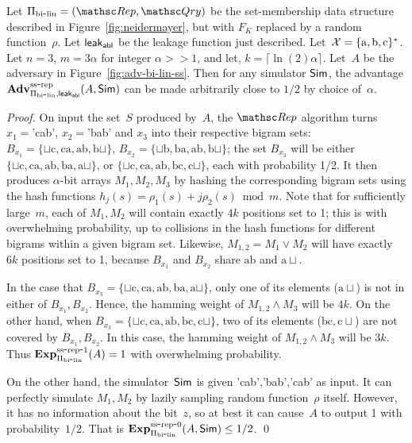 \begin{theorem}\label{thm:bi-lin-ss}
Let $\setprim_{\bilin}= (\Rep, \Qry)$ be the set-membership data
structure described in Figure~\ref{fig:neidermayer}, but with
$F_{K}$ replaced by a random function~$\rho$. Let
${\sf leak}_{\mathsf{abl}}$ be the leakage function just described.
Let~${\cal X}=\{\mathrm{a,b,c}\}^*$. Let $n=3$,  $m=3\alpha $ for
integer $\alpha >> 1$, and let, $k = \lceil \ln(2) \alpha
\rceil$.  Let~$A$ be the adversary in
Figure~\ref{fig:adv-bi-lin-ss}.  Then for any simulator ${\sf Sim}$, the
advantage
$\mathrm{\mathbf{Adv}}^{\mathrm{ss\mbox{-}rep}}_{\Pi_{\mathrm{bi}\mbox{-}\mathrm{lin}},{\sf leak}_{\mathsf{abl}}}(A,{\sf Sim})$ can be
made arbitrarily close to $1/2$ by choice of~$\alpha$.
\end{theorem}
\begin{proof}
On input the set~$S$ produced by~$A$, the $\Rep$ algorithm turns $x_1=$'cab', $x_2=$'bab' and $x_3$ into their respective bigram sets: $B_{x_1}=\{\sqcup\mathrm{c},\mathrm{ca},\mathrm{ab},\mathrm{b}\sqcup\}$, $B_{x_2}=\{\sqcup\mathrm{b},\mathrm{ba},\mathrm{ab}, \mathrm{b}\sqcup \}$; the set $B_{x_3}$ will be either $\{\sqcup\mathrm{c},\mathrm{ca},\mathrm{ab},\mathrm{ba}, \mathrm{a}\sqcup\}$, or $\{\sqcup\mathrm{c},\mathrm{ca},\mathrm{ab},\mathrm{bc}, \mathrm{c}\sqcup\}$, each with probability 1/2.  It then produces $\alpha$-bit arrays $M_1, M_2, M_3$ by hashing the corresponding bigram sets using the hash functions $h_j(s)=\rho_1(s)+ j\rho_2(s) \bmod m$.  Note that for sufficiently large~$m$, each of $M_1,M_2$ will contain exactly $4k$ positions set to 1; this is with overwhelming probability, up to collisions in the hash functions for different bigrams within a given bigram set.  Likewise, $M_{1,2}=M_1 \vee M_2$ will have exactly $6k$ positions set to 1, because $B_{x_1}$ and $B_{x_2}$ share $\mathrm{ab}$ and $\mathrm{a}\sqcup$.

In the case that $B_{x_3}=\{\sqcup\mathrm{c},\mathrm{ca},\mathrm{ab},\mathrm{ba}, \mathrm{a}\sqcup\}$, only one of its elements ($\mathrm{a}\sqcup$) is not in either of $B_{x_1},B_{x_2}$.  Hence, the hamming weight of $M_{1,2}\wedge M_3$ will be $4k$.  On the other hand, when $B_{x_3} = \{\sqcup\mathrm{c},\mathrm{ca},\mathrm{ab},\mathrm{bc}, \mathrm{c}\sqcup\}$, two of its elements ($\mathrm{bc}, \mathrm{c}\sqcup$) are not covered by $B_{x_1},B_{x_2}$.  In this case, the hamming weight of $M_{1,2} \wedge M_3$ will be $3k$.  Thus $\mathrm{\mathbf{Exp}}^{\mathrm{ss\mbox{-}rep\mbox{-}1}}_{\Pi_{\mathrm{bi}\mbox{-}\mathrm{lin}}}(A)=1$ with overwhelming probability.

On the other hand, the simulator~${\sf Sim}$ is given 'cab','bab','cab' as
input.  It can perfectly simulate $M_1,M_2$ by lazily sampling random
function~$\rho$ itself.  However, it has no information about the
bit~$z$, so at best it can cause~$A$ to output 1 with
probability~$1/2$.  That is $\mathrm{\mathbf{Exp}}^{\mathrm{ss\mbox{-}rep\mbox{-}0}}_{\Pi_{\mathrm{bi}\mbox{-}\mathrm{lin}}}(A,{\sf Sim}) \leq 1/2$. \hfill\qed
\end{proof}




